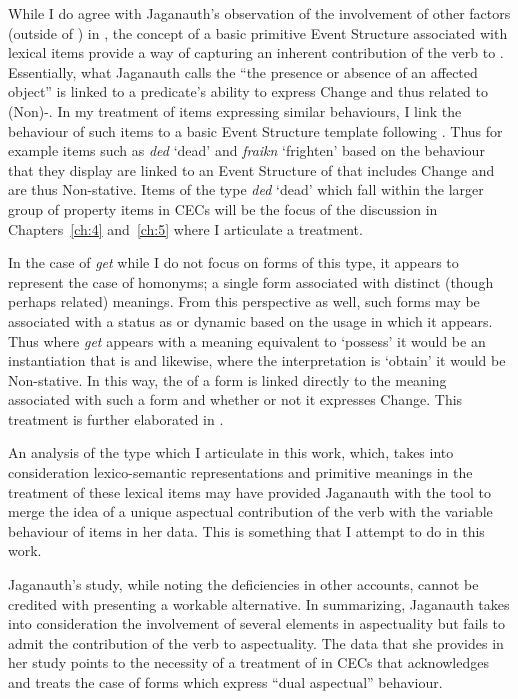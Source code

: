 While I do agree with Jaganauth’s observation of the involvement of
other factors (outside of ) in , the
concept of a basic primitive Event Structure associated with lexical
items provide a way of capturing an inherent contribution of the verb
to .  Essentially, what Jaganauth calls the ``the presence or
absence of an affected object” is linked to a predicate’s ability to
express Change and thus related to (Non)-.  In my treatment
of items expressing similar behaviours, I link the behaviour of such
items to a basic Event Structure template following \citet{Pustejovsky1988,Pustejovsky1991}.  Thus for example items such as \textit{ded} `dead' and
\textit{fraikn} `frighten' based on the behaviour that they display
are linked to an Event Structure of  that includes Change
and are thus Non-stative.  Items of the type \textit{ded} `dead' which
fall within the larger group of property items in CECs will be the
focus of the discussion in Chapters~\ref{ch:4} and~\ref{ch:5} where I articulate a
treatment.

In the case of \textit{get} while I do not focus on forms of this
type, it appears to represent the case of homonyms; a single form
associated with distinct (though perhaps related) meanings.  From this
perspective as well, such forms may be associated with a status as
 or dynamic based on the usage in which it appears.  Thus where
\textit{get} appears with a meaning equivalent to `possess' it would
be an instantiation that is  and likewise, where the
interpretation is `obtain' it would be Non-stative.  In this way, the
 of a form is linked directly to the meaning
associated with such a form and whether or not it expresses Change.
This treatment is further elaborated in .

An analysis of the type which I articulate in this work, which, takes
into consideration lexico-semantic representations and primitive
meanings in the treatment of these lexical items may have provided Jaganauth
with the tool to merge the idea of a unique aspectual contribution of
the verb with the variable behaviour of items in her data.  This is
something that I attempt to do in this work.

Jaganauth’s study, while noting the deficiencies in other accounts,
cannot be credited with presenting a workable alternative.  In
summarizing, Jaganauth takes into consideration the involvement of
several elements in aspectuality but fails to admit the contribution
of the verb to aspectuality.  The data that she provides in her study
points to the necessity of a treatment of  in CECs that
acknowledges and treats the case of forms which express ``dual
aspectual'' behaviour.

